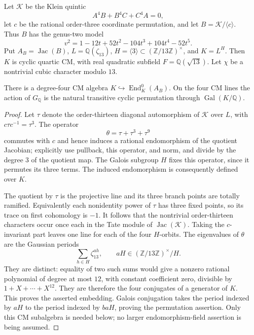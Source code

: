 Let $\mathcal K$ be the Klein quintic
\[
 A^4B+B^4C+C^4A=0,
\]
let $c$ be the rational order-three coordinate permutation, and let
$B=\mathcal K/\langle c\rangle$.  Thus $B$ has the genus-two model
\[
 v^2=1-12t+52t^2-104t^3+104t^4-52t^5.
\]
Put $A_B=\operatorname{Jac}(B)$, $L=\mathbb Q(\zeta_{13})$,
$H=\langle3\rangle\subset(\mathbb Z/13\mathbb Z)^\times$, and
$K=L^H$.  Then $K$ is cyclic quartic CM, with real quadratic subfield
$F=\mathbb Q(\sqrt{13})$.  Let $\chi$ be a nontrivial cubic character
modulo $13$.

\begin{lemma}
\label{lem:lm-thirteen-cm-field}
There is a degree-four CM algebra
$K\hookrightarrow\operatorname{End}^0_K(A_B)$.  On the four CM lines
the action of $G_{\mathbb Q}$ is the natural transitive cyclic
permutation through $\operatorname{Gal}(K/\mathbb Q)$.
\end{lemma}
\begin{proof}
Let $\tau$ denote the order-thirteen diagonal automorphism of
$\mathcal K$ over $L$, with $c\tau c^{-1}=\tau^3$.  The operator
\[
 \theta=\tau+\tau^3+\tau^9
\]
commutes with $c$ and hence induces a rational endomorphism of the
quotient Jacobian; explicitly use pullback, this operator, and norm,
and divide by the degree $3$ of the quotient map.  The Galois
subgroup $H$ fixes this operator, since it permutes its three terms.
The induced endomorphism is consequently defined over $K$.

The quotient by $\tau$ is the projective line and its three branch
points are totally ramified.  Equivalently each nonidentity power of
$\tau$ has three fixed points, so its trace on first cohomology is
$-1$.  It follows that the nontrivial order-thirteen characters
occur once each in the Tate module of
$\operatorname{Jac}(\mathcal K)$.  Taking the
$c$-invariant part leaves one line for each of the four $H$-orbits.
The eigenvalues of $\theta$ are the Gaussian periods
\[
 \sum_{h\in H}\zeta_{13}^{ah},
 \qquad aH\in(\mathbb Z/13\mathbb Z)^\times/H.
\]
They are distinct: equality of two such sums would give a nonzero
rational polynomial of degree at most $12$, with constant coefficient
zero, divisible by $1+X+\cdots+X^{12}$.  They are therefore the four
conjugates of a generator of $K$.  This proves the asserted embedding.
Galois conjugation takes the period indexed by $aH$ to the period
indexed by $baH$, proving the permutation assertion.  Only this CM
subalgebra is needed below; no larger endomorphism-field assertion
is being assumed.
\end{proof}

